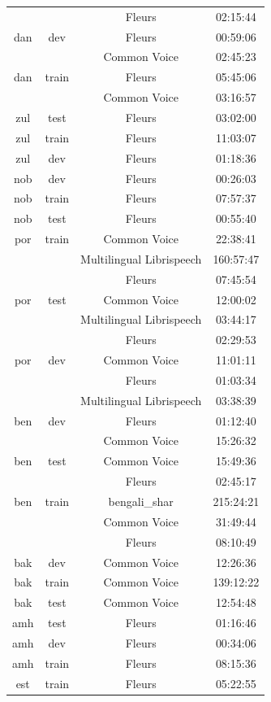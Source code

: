 \begin{longtable}{cccc}
 & & Fleurs & 02:15:44 \\ 
dan & dev & Fleurs & 00:59:06 \\ 
 & & Common Voice & 02:45:23 \\ 
dan & train & Fleurs & 05:45:06 \\ 
 & & Common Voice & 03:16:57 \\ \midrule
zul & test & Fleurs & 03:02:00 \\ 
zul & train & Fleurs & 11:03:07 \\ 
zul & dev & Fleurs & 01:18:36 \\ \midrule
nob & dev & Fleurs & 00:26:03 \\ 
nob & train & Fleurs & 07:57:37 \\ 
nob & test & Fleurs & 00:55:40 \\ \midrule
por & train & Common Voice & 22:38:41 \\ 
 & & Multilingual Librispeech & 160:57:47 \\ 
 & & Fleurs & 07:45:54 \\ 
por & test & Common Voice & 12:00:02 \\ 
 & & Multilingual Librispeech & 03:44:17 \\ 
 & & Fleurs & 02:29:53 \\ 
por & dev & Common Voice & 11:01:11 \\ 
 & & Fleurs & 01:03:34 \\ \midrule
 & & Multilingual Librispeech & 03:38:39 \\ 
ben & dev & Fleurs & 01:12:40 \\ 
 & & Common Voice & 15:26:32 \\ 
ben & test & Common Voice & 15:49:36 \\ 
 & & Fleurs & 02:45:17 \\ 
ben & train & bengali_shar & 215:24:21 \\ 
 & & Common Voice & 31:49:44 \\ 
 & & Fleurs & 08:10:49 \\ \midrule
bak & dev & Common Voice & 12:26:36 \\ 
bak & train & Common Voice & 139:12:22 \\ 
bak & test & Common Voice & 12:54:48 \\ \midrule
amh & test & Fleurs & 01:16:46 \\ 
amh & dev & Fleurs & 00:34:06 \\ 
amh & train & Fleurs & 08:15:36 \\ \midrule
est & train & Fleurs & 05:22:55 \\ 

\end{longtable}
